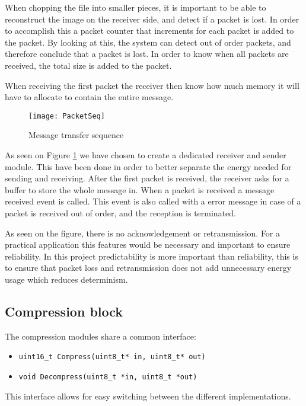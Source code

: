 When chopping the file into smaller pieces, it is important to be able to reconstruct the image on the receiver side, and detect if a packet is lost. 
In order to accomplish this a packet counter that increments for each packet is added to the packet. 
By looking at this, the system can detect out of order packets, and therefore conclude that a packet is lost. 
In order to know when all packets are received, the total size is added to the packet.

When receiving the first packet the receiver then know how much memory it will have to allocate to contain the entire message. 


\begin{figure}[H]
	\centering
	\texttt{[image: PacketSeq]}
	\caption{Message transfer sequence }
	\label{fig:PacketSeq}
\end{figure}

As seen on Figure \ref{fig:PacketSeq} we have chosen to create a dedicated receiver and sender module. 
This have been done in order to better separate the energy needed for sending and receiving. 
After the first packet is received, the receiver asks for a buffer to store the whole message in. 
When a packet is received a message received event is called. 
This event is also called with a error message in case of a packet is received out of order, and the reception is terminated. 

As seen on the figure, there is no acknowledgement or retransmission. 
For a practical application this features would be necessary and important to ensure reliability.
In this project predictability is more important than reliability, this is to ensure that packet loss and retransmission does not add unnecessary energy usage which reduces determinism.


\subsection{Compression block}
\label{sec:Compression-block}

The compression modules share a common interface: 

\begin{itemize}
    \item \texttt{uint16\_t Compress(uint8\_t* in, uint8\_t* out)}
    \item \texttt{void Decompress(uint8\_t *in, uint8\_t *out)}
\end{itemize}

This interface allows for easy switching between the different implementations.

